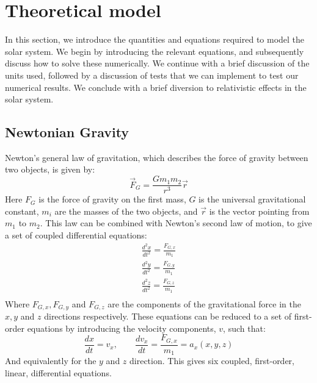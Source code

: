 \documentclass[a4paper, 10pt]{article}
\begin{document}
\section{Theoretical model}\label{Theoretical_section}
In this section, we introduce the quantities and equations required to model the solar system. We begin by introducing the relevant equations, and subsequently discuss how to solve these numerically. We continue with a brief discussion of the units used, followed by a discussion of tests that we can implement to test our numerical results. We conclude with a brief diversion to relativistic effects in the solar system.
\subsection{Newtonian Gravity}\label{Newtonian_Gravity}
Newton's general law of gravitation, which describes the force of gravity between two objects, is given by:
\begin{equation}
\vec{F}_{G}=\frac{Gm_1m_2}{r^3}\vec{r}
\end{equation}
Here $F_G$ is the force of gravity on the first mass, $G$ is the universal gravitational constant, $m_i$ are the masses of the two objects, and $\vec{r}$ is the vector pointing from $m_1$ to $m_2$. This law can be combined with Newton's second law of motion, to give a set of coupled differential equations:
\begin{equation}\label{eq:coupled_diff}
\begin{split}
\frac{d^2x}{dt^2}=\frac{F_{G,x}}{m_1}\\
\frac{d^2 y}{dt^2}=\frac{F_{G,y}}{m_1}\\
\frac{d^2 z}{dt^2}=\frac{F_{G,z}}{m_1}\\
\end{split}
\end{equation}
Where $F_{G,x}, F_{G,y}$ and $F_{G,z}$ are the components of the gravitational force in the $x, y$ and $z$ directions respectively. These equations can be reduced to a set of first-order equations by introducing the velocity components, $v$, such that:
\begin{equation}\label{eq:Velocity_position_equation}
\frac{dx}{dt}=v_x, \quad \quad \frac{dv_x}{dt}=\frac{F_{G,x}}{m_1}=a_x(x,y,z)
\end{equation}
And equivalently for the $y$ and $z$ direction. This gives six coupled, first-order, linear, differential equations.
\end{document}
